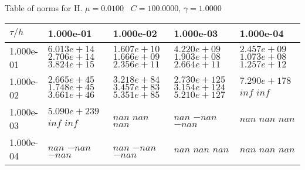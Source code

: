 \begin{center}
Table of norms for H. $\mu = 0.0100$ \, $C = 100.0000$, $\gamma = 1.0000$
  
\begin{tabular}{|p{1in}|p{1in}|p{1in}|p{1in}|p{1in}|} \hline
$\tau / h$ &1.000e-01 &1.000e-02 &1.000e-03 &1.000e-04 \\ \hline 
1.000e-01 & $6.013e+14$  $2.706e+14$  $3.824e+15$  & $1.607e+10$  $1.666e+09$  $2.356e+11$  & $4.220e+09$  $1.903e+08$  $2.664e+11$  & $2.457e+09$  $1.073e+08$  $1.257e+12$  \\ \hline 
1.000e-02 & $2.665e+45$  $1.748e+45$  $3.661e+46$  & $3.218e+84$  $3.457e+83$  $5.351e+85$  & $2.730e+125$  $3.154e+124$  $5.210e+127$  & $7.290e+178$  $inf$  $inf$  \\ \hline 
1.000e-03 & $5.090e+239$  $inf$  $inf$  & $nan$  $nan$  $nan$  & $nan$  $-nan$  $-nan$  & $nan$  $nan$  $nan$  \\ \hline 
1.000e-04 & $nan$  $-nan$  $-nan$  & $nan$  $-nan$  $-nan$  & $nan$  $nan$  $nan$  & $nan$  $nan$  $nan$  \\ \hline 

\end{tabular}\\[20pt]
\end{center}
